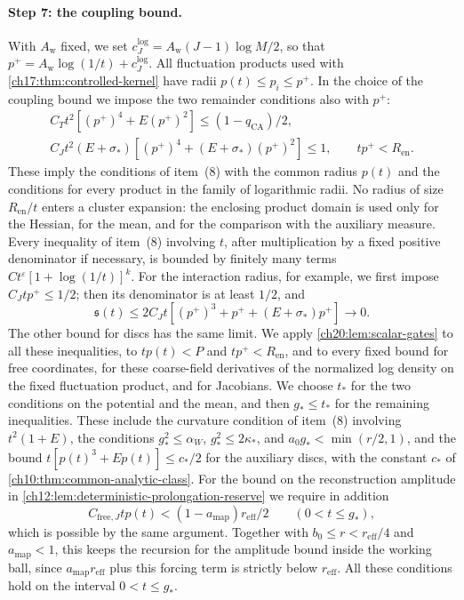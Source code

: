\paragraph{Step 7: the coupling bound.}
With $A_{\mathrm w}$ fixed, we set $c_J^{\log}=A_{\mathrm w}(J-1)\log M/2$, so that $p^+=A_{\mathrm w}\log(1/t)+c_J^{\log}$. All fluctuation products used with \cref{ch17:thm:controlled-kernel} have radii $p(t)\le p_i\le p^+$. In the choice of the coupling bound we impose the two remainder conditions also with $p^+$:
\begin{equation}\label{ch20:eq:log-family-gates}
 \begin{gathered}
 C_Tt^2[(p^+)^4+E(p^+)^2]\le(1-q_{\mathrm{CA}})/2,\\
 C_Jt^2(E+\sigma_*)[(p^+)^4+(E+\sigma_*)(p^+)^2]\le1,\qquad tp^+<R_{\mathrm{en}}.
 \end{gathered}
\end{equation}
These imply the conditions of item~(8) with the common radius $p(t)$ and the conditions for every product in the family of logarithmic radii. No radius of size $R_{\mathrm{en}}/t$ enters a cluster expansion: the enclosing product domain is used only for the Hessian, for the mean, and for the comparison with the auxiliary measure. Every inequality of item~(8) involving $t$, after multiplication by a fixed positive denominator if necessary, is bounded by finitely many terms $Ct^\varepsilon[1+\log(1/t)]^k$. For the interaction radius, for example, we first impose $C_Jtp^+\le1/2$; then its denominator is at least $1/2$, and
\[
 \mathfrak s(t)\le2C_Jt[(p^+)^3+p^++(E+\sigma_*)p^+]\longrightarrow0.
\]
The other bound for discs has the same limit. We apply \cref{ch20:lem:scalar-gates} to all these inequalities, to $tp(t)<P$ and $tp^+<R_{\mathrm{en}}$, and to every fixed bound for free coordinates, for these coarse-field derivatives of the normalized log density on the fixed fluctuation product, and for Jacobians. We choose $t_*$ for the two conditions on the potential and the mean, and then $g_*\le t_*$ for the remaining inequalities. These include the curvature condition of item~(8) involving $t^2(1+E)$, the conditions $g_*^2\le\alpha_W$, $g_*^2\le2\kappa_*$, and $a_0g_*<\min(r/2,1)$, and the bound $t[p(t)^3+Ep(t)]\le c_*/2$ for the auxiliary discs, with the constant $c_*$ of \cref{ch10:thm:common-analytic-class}. For the bound on the reconstruction amplitude in \cref{ch12:lem:deterministic-prolongation-reserve} we require in addition
\begin{equation}\label{ch20:eq:cap-ceiling}
 C_{\mathrm{free},J}tp(t)<(1-a_{\mathrm{map}})r_{\mathrm{eff}}/2\qquad(0<t\le g_*),
\end{equation}
which is possible by the same argument. Together with $b_0\le r<r_{\mathrm{eff}}/4$ and $a_{\mathrm{map}}<1$, this keeps the recursion for the amplitude bound inside the working ball, since $a_{\mathrm{map}}r_{\mathrm{eff}}$ plus this forcing term is strictly below $r_{\mathrm{eff}}$. All these conditions hold on the interval $0<t\le g_*$.

